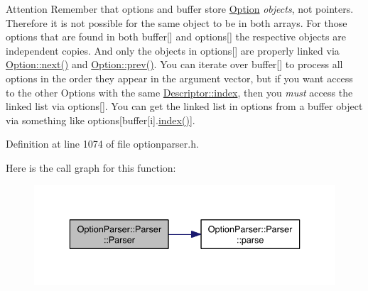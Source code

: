\begin{DoxyAttention}{Attention}
Remember that {\ttfamily options} and {\ttfamily buffer} store \hyperlink{class_option_parser_1_1_option}{Option} {\itshape objects}, not pointers. Therefore it is not possible for the same object to be in both arrays. For those options that are found in both {\ttfamily buffer}\mbox{[}\mbox{]} and {\ttfamily options}\mbox{[}\mbox{]} the respective objects are independent copies. And only the objects in {\ttfamily options}\mbox{[}\mbox{]} are properly linked via \hyperlink{class_option_parser_1_1_option_ab06f7c1798782d301d35265eda2b95a5}{Option\-::next()} and \hyperlink{class_option_parser_1_1_option_aa17639d1c0e0ae5eae682080ae93d5a3}{Option\-::prev()}. You can iterate over {\ttfamily buffer}\mbox{[}\mbox{]} to process all options in the order they appear in the argument vector, but if you want access to the other Options with the same \hyperlink{struct_option_parser_1_1_descriptor_ae62860781844b44c0bd4f730c96701d7}{Descriptor\-::index}, then you {\itshape must} access the linked list via {\ttfamily options}\mbox{[}\mbox{]}. You can get the linked list in options from a buffer object via something like {\ttfamily options}\mbox{[}buffer\mbox{[}i\mbox{]}.\hyperlink{namespace_networ_kit_a486772e5516be73694ef0d780b828d04}{index()}\mbox{]}. 
\end{DoxyAttention}


Definition at line 1074 of file optionparser.\-h.



Here is the call graph for this function\-:\nopagebreak
\begin{figure}[H]
\begin{center}
\leavevmode
\includegraphics[width=336pt]{class_option_parser_1_1_parser_a7a82d034afe73e9954c47ab7363dfa5c_cgraph}
\end{center}
\end{figure}


